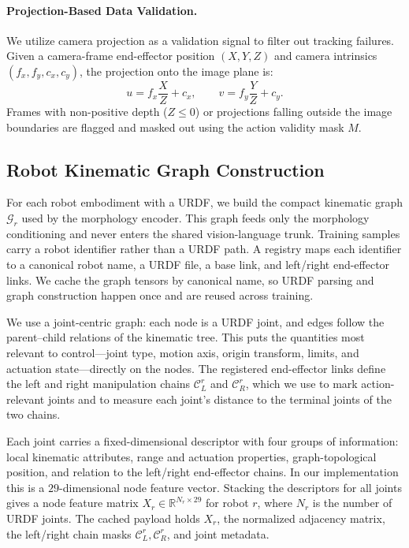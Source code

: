 \paragraph{Projection-Based Data Validation.}
We utilize camera projection as a validation signal to filter out tracking failures. Given a camera-frame end-effector position $(X,Y,Z)$ and camera intrinsics $(f_x,f_y,c_x,c_y)$, the projection onto the image plane is:
\begin{equation}
    u = f_x \frac{X}{Z} + c_x,
    \qquad
    v = f_y \frac{Y}{Z} + c_y.
\end{equation}
Frames with non-positive depth ($Z \le 0$) or projections falling outside the image boundaries are flagged and masked out using the action validity mask $M$.

\subsection{Robot Kinematic Graph Construction}
\label{app:urdf-graph-construction}

For each robot embodiment with a URDF, we build the compact kinematic graph $\mathcal{G}_{r}$ used by the morphology encoder. This graph feeds only the morphology conditioning and never enters the shared vision-language trunk. Training samples carry a robot identifier rather than a URDF path. A registry maps each identifier to a canonical robot name, a URDF file, a base link, and left/right end-effector links. We cache the graph tensors by canonical name, so URDF parsing and graph construction happen once and are reused across training.

We use a joint-centric graph: each node is a URDF joint, and edges follow the parent--child relations of the kinematic tree. This puts the quantities most relevant to control---joint type, motion axis, origin transform, limits, and actuation state---directly on the nodes. The registered end-effector links define the left and right manipulation chains $\mathcal{C}^{r}_{L}$ and $\mathcal{C}^{r}_{R}$, which we use to mark action-relevant joints and to measure each joint's distance to the terminal joints of the two chains.

Each joint carries a fixed-dimensional descriptor with four groups of information: local kinematic attributes, range and actuation properties, graph-topological position, and relation to the left/right end-effector chains. In our implementation this is a $29$-dimensional node feature vector. Stacking the descriptors for all joints gives a node feature matrix $X_r \in \mathbb{R}^{N_r \times 29}$ for robot $r$, where $N_r$ is the number of URDF joints. The cached payload holds $X_r$, the normalized adjacency matrix, the left/right chain masks $\mathcal{C}^{r}_{L}, \mathcal{C}^{r}_{R}$, and joint metadata.


